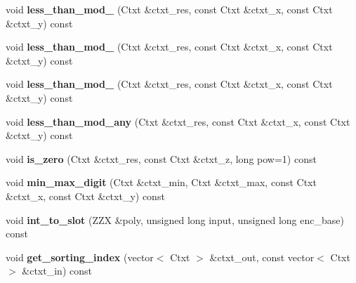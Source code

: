 \begin{DoxyCompactItemize}
\item 
\mbox{\label{classhe__cmp_1_1Comparator_a216adf529384387be0e161de97180857}} 
void {\bfseries less\+\_\+than\+\_\+mod\+\_} (Ctxt \&ctxt\+\_\+res, const Ctxt \&ctxt\+\_\+x, const Ctxt \&ctxt\+\_\+y) const
\item 
\mbox{\label{classhe__cmp_1_1Comparator_ab77a807d0f50f52d01fc90f0ba79490b}} 
void {\bfseries less\+\_\+than\+\_\+mod\+\_} (Ctxt \&ctxt\+\_\+res, const Ctxt \&ctxt\+\_\+x, const Ctxt \&ctxt\+\_\+y) const
\item 
\mbox{\label{classhe__cmp_1_1Comparator_a243299248570170168650fdce1285aab}} 
void {\bfseries less\+\_\+than\+\_\+mod\+\_} (Ctxt \&ctxt\+\_\+res, const Ctxt \&ctxt\+\_\+x, const Ctxt \&ctxt\+\_\+y) const
\item 
\mbox{\label{classhe__cmp_1_1Comparator_a2cf9af741884ce938cc6c337b6901a89}} 
void {\bfseries less\+\_\+than\+\_\+mod\+\_\+any} (Ctxt \&ctxt\+\_\+res, const Ctxt \&ctxt\+\_\+x, const Ctxt \&ctxt\+\_\+y) const
\item 
\mbox{\label{classhe__cmp_1_1Comparator_a8b5d7f6b2a7974ef12428874d42cd480}} 
void {\bfseries is\+\_\+zero} (Ctxt \&ctxt\+\_\+res, const Ctxt \&ctxt\+\_\+z, long pow=1) const
\item 
\mbox{\label{classhe__cmp_1_1Comparator_a8978f6bbadd5b9d174a49316ec56c990}} 
void {\bfseries min\+\_\+max\+\_\+digit} (Ctxt \&ctxt\+\_\+min, Ctxt \&ctxt\+\_\+max, const Ctxt \&ctxt\+\_\+x, const Ctxt \&ctxt\+\_\+y) const
\item 
\mbox{\label{classhe__cmp_1_1Comparator_a716fb895d5a693d09e8e949d6fdd6e52}} 
void {\bfseries int\+\_\+to\+\_\+slot} (Z\+ZX \&poly, unsigned long input, unsigned long enc\+\_\+base) const
\item 
\mbox{\label{classhe__cmp_1_1Comparator_a805987829f22a28bc0849bfcae44e702}} 
void {\bfseries get\+\_\+sorting\+\_\+index} (vector$<$ Ctxt $>$ \&ctxt\+\_\+out, const vector$<$ Ctxt $>$ \&ctxt\+\_\+in) const
\item 

\end{DoxyCompactItemize}
